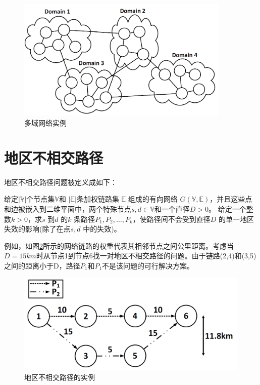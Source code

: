 \begin{figure}[htbp]
  \centering
  \includegraphics[width=4.0in]{figures/MultiDomainNetwork}
  \caption{多域网络实例}
  \label{fig:MultiDomainNetwork}
\end{figure}
\section{地区不相交路径}
地区不相交路径问题被定义成如下：

\begin{definition}[地区不相交路径问题]
给定$|\mathbb{V}|$个节点集$\mathbb{V}$和 $|\mathbb{E}|$条加权链路集 $\mathbb{E}$ 组成的有向网络 $G(\mathbb{V},\mathbb{E})$，并且这些点和边被嵌入到二维平面中，两个特殊节点$s,d\in\mathbb{V}$和一个直径$D>0$。 给定一个整数$k>0$，求$s$ 到$d$ 的$k$ 条路径$P_1,P_2,\ldots,P_k$，使路径间不会受到直径$D$ 的单一地区失效的影响(除了在点$s,d$ 中的失效)。
\end{definition}

例如，如图\ref{fig:RegionDisjointPath}所示的网络链路的权重代表其相邻节点之间公里距离。考虑当$D=15 km$时从节点1到节点6找一对地区不相交路径的问题。由于链路(2,4)和(3,5)之间的距离小于D，路径$P_1$和$P_1$不是该问题的可行解决方案。


\begin{figure}[htbp]
  \centering
  \includegraphics[width=4.5in]{figures/RegionDisjointPath}
  \caption{地区不相交路径的实例}
  \label{fig:RegionDisjointPath}
\end{figure}
